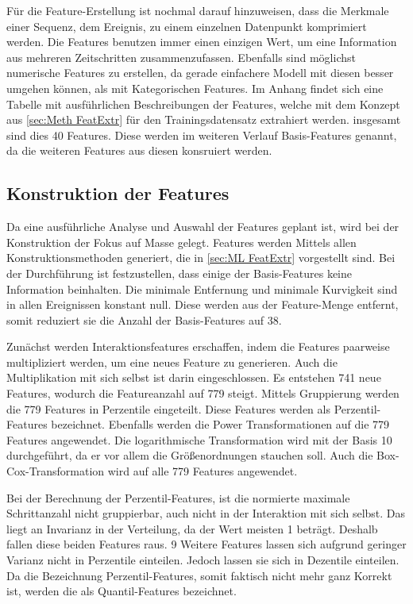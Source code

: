 Für die Feature-Erstellung ist nochmal darauf hinzuweisen, dass die Merkmale einer Sequenz, dem Ereignis, zu einem einzelnen Datenpunkt komprimiert werden. Die Features benutzen immer einen einzigen Wert, um eine Information aus mehreren Zeitschritten zusammenzufassen. Ebenfalls sind möglichst numerische Features zu erstellen, da gerade einfachere Modell mit diesen besser umgehen können, als mit Kategorischen Features. Im Anhang findet sich eine Tabelle mit ausführlichen Beschreibungen der Features, welche mit dem Konzept aus \ref{sec:Meth FeatExtr} für den Trainingsdatensatz extrahiert werden. insgesamt sind dies 40 Features. Diese werden im weiteren Verlauf Basis-Features genannt, da die weiteren Features aus diesen konsruiert werden.\par


\subsection{Konstruktion der Features} \label{sec:Meth KonstrFeatures}
Da eine ausführliche Analyse und Auswahl der Features geplant ist, wird bei der Konstruktion der Fokus auf Masse gelegt. Features werden Mittels allen Konstruktionsmethoden generiert, die in \ref{sec:ML FeatExtr} vorgestellt sind. Bei der Durchführung ist festzustellen, dass einige der Basis-Features keine Information beinhalten. Die minimale Entfernung und minimale Kurvigkeit sind in allen Ereignissen konstant null. Diese werden aus der Feature-Menge entfernt, somit reduziert sie die Anzahl der Basis-Features auf 38.\par

Zunächst werden Interaktionsfeatures erschaffen, indem die Features paarweise multipliziert werden, um eine neues Feature zu generieren. Auch die Multiplikation mit sich selbst ist darin eingeschlossen. Es entstehen 741 neue Features, wodurch die Featureanzahl auf 779 steigt. Mittels Gruppierung werden die 779 Features in Perzentile eingeteilt. Diese Features werden als Perzentil-Features bezeichnet. Ebenfalls werden die Power Transformationen auf die 779 Features angewendet. Die logarithmische Transformation wird mit der Basis 10 durchgeführt, da er vor allem die Größenordnungen stauchen soll. Auch die Box-Cox-Transformation wird auf alle 779 Features angewendet. \par

Bei der Berechnung der Perzentil-Features, ist die normierte maximale Schrittanzahl nicht gruppierbar, auch nicht in der Interaktion mit sich selbst. Das liegt an Invarianz in der Verteilung, da der Wert meisten 1 beträgt. Deshalb fallen diese beiden Features raus. 9 Weitere Features lassen sich aufgrund geringer Varianz nicht in Perzentile einteilen. Jedoch lassen sie sich in Dezentile einteilen. Da die Bezeichnung Perzentil-Features, somit faktisch nicht mehr ganz Korrekt ist, werden die als Quantil-Features bezeichnet. \par

